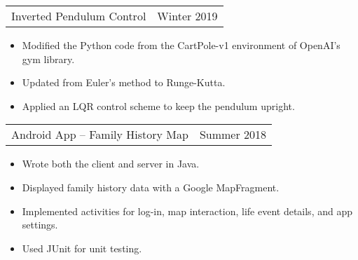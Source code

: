 \documentclass{article}
\newenvironment{compactItemize}{
  \begin{itemize}[itemsep=0ex, parsep=0ex, partopsep=0ex, topsep= -7pt]
}{
  \end{itemize}
}
\newcommand{\project}[2]{
  \begingroup
  \setlength{\tabcolsep}{0ex}
  \begin{tabularx}{\linewidth}{X r}
    #1 & %
    #2\\ %
  \end{tabularx}%
  \endgroup%
}
\begin{document}
\project{Inverted Pendulum Control}{Winter 2019}
\begin{compactItemize}
  \item Modified the Python code from the CartPole-v1 environment of OpenAI's gym library.
  \item Updated from Euler's method to Runge-Kutta.
  \item Applied an LQR control scheme to keep the pendulum upright.
\end{compactItemize}
\medskip

\project{Android App -- Family History Map}{Summer 2018}
\begin{compactItemize}
  \item Wrote both the client and server in Java.
  \item Displayed family history data with a Google MapFragment.
  \item Implemented activities for log-in, map interaction, life event details, and app settings.
  \item Used JUnit for unit testing.
\end{compactItemize}
\end{document}
